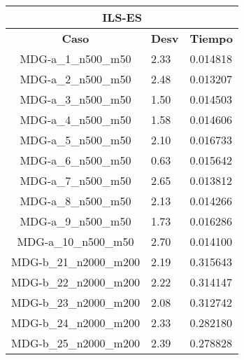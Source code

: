\documentclass[10pt,a4paper]{article}
\begin{document}
\begin{table}[]
	\centering
	\begin{tabular}{|c|l|l|}
		\hline
		\multicolumn{3}{|c|}{\textbf{ILS-ES}}                                                              \\ \hline
		\textbf{Caso}          & \multicolumn{1}{c|}{\textbf{Desv}} & \multicolumn{1}{c|}{\textbf{Tiempo}} \\ \hline
		MDG-a\_1\_n500\_m50    & 2.33                               & 0.014818                             \\ \hline
		MDG-a\_2\_n500\_m50    & 2.48                               & 0.013207                             \\ \hline
		MDG-a\_3\_n500\_m50    & 1.50                               & 0.014503                             \\ \hline
		MDG-a\_4\_n500\_m50    & 1.58                               & 0.014606                             \\ \hline
		MDG-a\_5\_n500\_m50    & 2.10                               & 0.016733                             \\ \hline
		MDG-a\_6\_n500\_m50    & 0.63                               & 0.015642                             \\ \hline
		MDG-a\_7\_n500\_m50    & 2.65                               & 0.013812                             \\ \hline
		MDG-a\_8\_n500\_m50    & 2.13                               & 0.014266                             \\ \hline
		MDG-a\_9\_n500\_m50    & 1.73                               & 0.016286                             \\ \hline
		MDG-a\_10\_n500\_m50   & 2.70                               & 0.014100                             \\ \hline
		MDG-b\_21\_n2000\_m200 & 2.19                               & 0.315643                             \\ \hline
		MDG-b\_22\_n2000\_m200 & 2.22                               & 0.314147                             \\ \hline
		MDG-b\_23\_n2000\_m200 & 2.08                               & 0.312742                             \\ \hline
		MDG-b\_24\_n2000\_m200 & 2.33                               & 0.282180                             \\ \hline
		MDG-b\_25\_n2000\_m200 & 2.39                               & 0.278828                             \\ \hline

\end{tabular}
\end{table}
\end{document}
